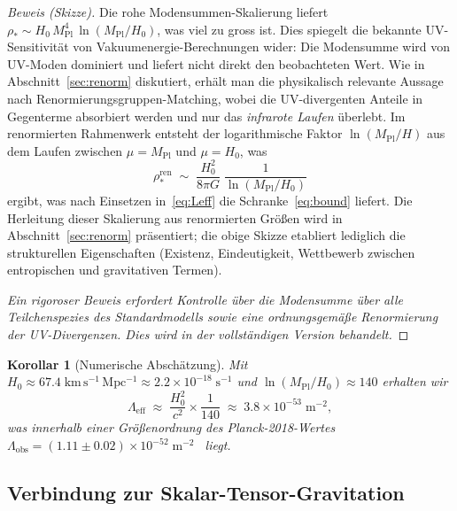 \documentclass[12pt,a4paper]{article}
\theoremstyle{definition}
\theoremstyle{plain}
\newtheorem{corollary}[definition]{Korollar}
\theoremstyle{remark}
\newcommand{\Leff}{\Lambda_{\mathrm{eff}}}
\begin{document}
\begin{proof}[Beweis (Skizze)]
Die rohe Modensummen-Skalierung liefert $\rho_{\ast} \sim
H_0\,M_{\mathrm{Pl}}^{4}\,\ln(M_{\mathrm{Pl}}/H_0)$, was viel zu gross
ist. Dies spiegelt die bekannte UV-Sensitivit\"at von
Vakuumenergie-Berechnungen wider: Die Modensumme wird von UV-Moden
dominiert und liefert nicht direkt den beobachteten Wert. Wie in
Abschnitt~\ref{sec:renorm} diskutiert, erh\"alt man die physikalisch
relevante Aussage nach Renormierungsgruppen-Matching, wobei die
UV-divergenten Anteile in Gegenterme absorbiert werden und nur das
\emph{infrarote Laufen} \"uberlebt. Im renormierten Rahmenwerk entsteht
der logarithmische Faktor $\ln(M_{\mathrm{Pl}}/H)$ aus dem Laufen
zwischen $\mu = M_{\mathrm{Pl}}$ und $\mu = H_{0}$, was
\begin{equation}
  \rho_{\ast}^{\mathrm{ren}} \;\sim\;
  \frac{H_0^{2}}{8\pi G}\;
  \frac{1}{\ln(M_{\mathrm{Pl}}/H_0)}
\end{equation}
ergibt, was nach Einsetzen in~\eqref{eq:Leff} die
Schranke~\eqref{eq:bound} liefert. Die Herleitung dieser Skalierung
aus renormierten Gr\"o\ss en wird in Abschnitt~\ref{sec:renorm}
pr\"asentiert; die obige Skizze etabliert lediglich die strukturellen
Eigenschaften (Existenz, Eindeutigkeit, Wettbewerb zwischen
entropischen und gravitativen Termen).

\medskip\noindent
\emph{Ein rigoroser Beweis erfordert Kontrolle \"uber die Modensumme
\"uber alle Teilchenspezies des Standardmodells sowie eine
ordnungsgem\"a\ss e Renormierung der UV-Divergenzen. Dies wird in der
vollst\"andigen Version behandelt.}
\end{proof}

\begin{corollary}[Numerische Absch\"atzung]\label{cor:numerical}
Mit $H_0 \approx 67.4\;\mathrm{km\,s^{-1}\,Mpc^{-1}}
\approx 2.2 \times 10^{-18}\;\mathrm{s^{-1}}$ und
$\ln(M_{\mathrm{Pl}}/H_0) \approx 140$ erhalten wir
\begin{equation}
  \Leff \;\approx\;
  \frac{H_0^{2}}{c^{2}} \times \frac{1}{140}
  \;\approx\; 3.8 \times 10^{-53}\;\mathrm{m}^{-2},
\end{equation}
was innerhalb einer Gr\"o\ss enordnung des Planck-2018-Wertes
$\Lambda_{\mathrm{obs}} = (1.11 \pm 0.02) \times 10^{-52}\;
\mathrm{m}^{-2}$~\cite{Planck2018} liegt.
\end{corollary}

\subsection{Verbindung zur Skalar-Tensor-Gravitation}\label{sec:scalar-tensor}\label{sec:saturation}
\end{document}
